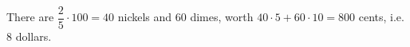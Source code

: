 There are $\dfrac25\cdot100=40$ nickels and $60$ dimes, worth $40\cdot5+60\cdot10=800$ cents, i.e. $\boxed{8}$ dollars.
